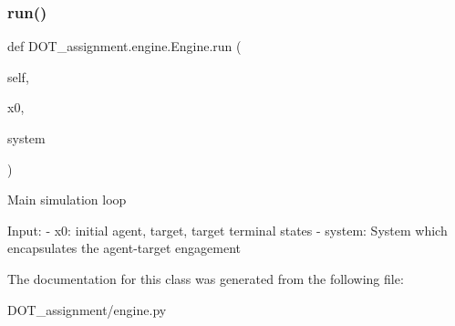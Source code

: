 \subsubsection{\texorpdfstring{run()}{run()}}
{\footnotesize\ttfamily def D\+O\+T\+\_\+assignment.\+engine.\+Engine.\+run (\begin{DoxyParamCaption}\item[{}]{self,  }\item[{}]{x0,  }\item[{}]{system }\end{DoxyParamCaption})}

\begin{DoxyVerb}Main simulation loop

Input:
- x0:           initial agent, target, target terminal states
- system:       System which encapsulates the agent-target engagement\end{DoxyVerb}
 

The documentation for this class was generated from the following file\+:\begin{DoxyCompactItemize}
\item 
D\+O\+T\+\_\+assignment/engine.\+py\end{DoxyCompactItemize}
